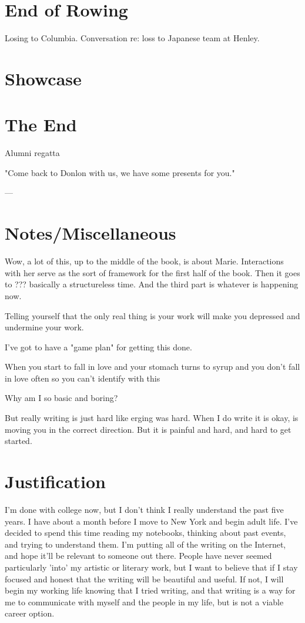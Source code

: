 \documentclass[12pt]{article}
\begin{document}
\section{End of Rowing}
Losing to Columbia.
Conversation re: loss to Japanese team at Henley.

\section{Showcase}

\section{The End}
Alumni regatta

"Come back to Donlon with us, we have some presents for you."

---

\section{Notes/Miscellaneous}
Wow, a lot of this, up to the middle of the book, is about Marie.  Interactions
with her serve as the sort of framework for the first half of the book.  Then it
goes to ???  basically a structureless time.  And the third part is whatever is
happening now.

Telling yourself that the only real thing is your work will make you depressed
and undermine your work.  

I've got to have a "game plan" for getting this done.

When you start to fall in love
and your stomach turns to syrup
and you don't fall in love often
so you can't identify with this

Why am I so basic and boring?

But really writing is just hard like erging was hard.  When I do write it is
okay, is moving you in the correct direction.  But it is painful and hard, and
hard to get started.

\section{Justification}
I'm done with college now, but I don't think I really understand the past five
years.  I have about a month before I move to New York and begin adult life.
I've decided to spend this time reading my notebooks, thinking about past
events, and trying to understand them.  I'm putting all of the writing on the
Internet, and hope it'll be relevant to someone out there.  People have never
seemed particularly 'into' my artistic or literary work, but I want to believe
that if I stay focused and honest that the writing will be beautiful and
useful.  If not, I will begin my working life knowing that I tried writing, and
that writing is a way for me to communicate with myself and the people in my
life, but is not a viable career option.
\end{document}
